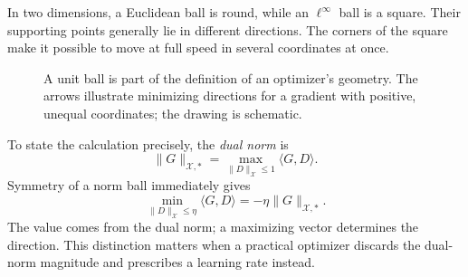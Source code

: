 In two dimensions, a Euclidean ball is round, while an \(\ell^\infty\) ball is a square.  Their supporting points generally lie in different directions.  The corners of the square make it possible to move at full speed in several coordinates at once.

\begin{figure}[H]
\centering
{}
\caption{A unit ball is part of the definition of an optimizer's geometry.  The arrows illustrate minimizing directions for a gradient with positive, unequal coordinates; the drawing is schematic.}
\label{fig:N20261017-norm-balls}
\end{figure}

To state the calculation precisely, the \emph{dual norm} is
\[
 \|G\|_{\mathcal X,*}
 =\max_{\|D\|_{\mathcal X}\leq1}\langle G,D\rangle.
\]
Symmetry of a norm ball immediately gives
\begin{equation}
 \min_{\|D\|_{\mathcal X}\leq\eta}\langle G,D\rangle
 =-\eta\|G\|_{\mathcal X,*}.
 \label{eq:N20261017-duality}
\end{equation}
The value comes from the dual norm; a maximizing vector determines the direction.  This distinction matters when a practical optimizer discards the dual-norm magnitude and prescribes a learning rate instead.

